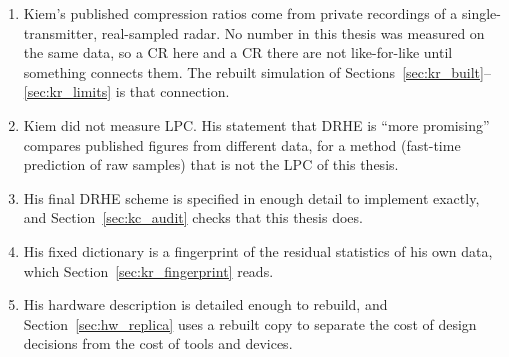 \begin{enumerate}
\item Kiem's published compression ratios come from private recordings of a
single-transmitter, real-sampled radar. No number in this thesis was measured
on the same data, so a CR here and a CR there are not like-for-like until
something connects them. The rebuilt simulation of
Sections~\ref{sec:kr_built}--\ref{sec:kr_limits} is that connection.
\item Kiem did not measure LPC. His statement that DRHE is ``more promising''
compares published figures from different data, for a method (fast-time
prediction of raw samples) that is not the LPC of this thesis.
\item His final DRHE scheme is specified in enough detail to implement exactly,
and Section~\ref{sec:kc_audit} checks that this thesis does.
\item His fixed dictionary is a fingerprint of the residual statistics of his
own data, which Section~\ref{sec:kr_fingerprint} reads.
\item His hardware description is detailed enough to rebuild, and
Section~\ref{sec:hw_replica} uses a rebuilt copy to separate the cost of
design decisions from the cost of tools and devices.
\end{enumerate}
